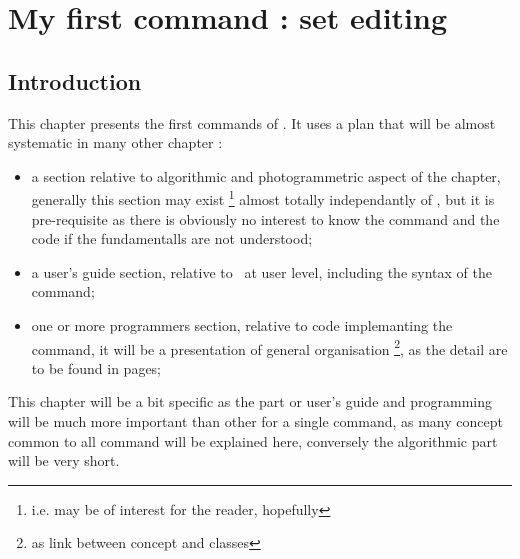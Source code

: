 


\chapter{My first command : set editing}


\section{Introduction}

This chapter presents the first commands of \PPP . It uses a plan that will be almost
systematic in many other chapter :

\begin{itemize}
   \item a section relative to algorithmic and photogrammetric aspect of the chapter, generally this
         section may exist \footnote{i.e. may be of interest for the reader, hopefully}
         almost totally independantly of \PPP, but it is pre-requisite as
         there is obviously no interest to know the command and the code if the fundamentalls are
         not understood;

   \item a  user's guide section, relative to \PPP\ at user level, including the syntax of the command;

   \item one or more   programmers  section, relative to \CPP code implemanting the command, it will be a
         presentation of general organisation \footnote{as link between concept and classes},
         as the detail are to be found in \doxy pages;

\end{itemize}

This chapter will be a bit specific as the part or user's guide and programming will be much more important 
than other for a single command, as many concept common to all command will be explained here,
conversely  the algorithmic part will be very short.

